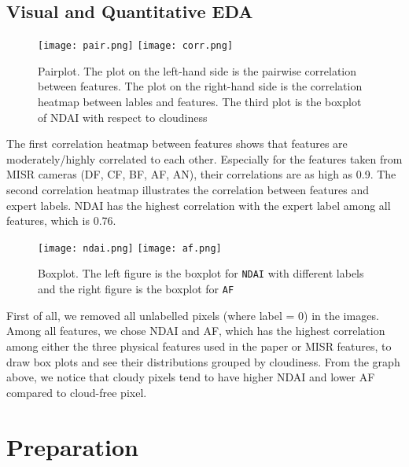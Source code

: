 \documentclass[letterpaper,11pt]{article}
\begin{document}
\subsection{Visual and Quantitative EDA}

\begin{figure}[!hbt]
    \centering
    \texttt{[image: pair.png]}
    \texttt{[image: corr.png]}
    \caption{Pairplot. The plot on the left-hand side is the pairwise correlation between features. The plot on the right-hand side is the correlation heatmap between lables and features. The third plot is the boxplot of NDAI with respect to cloudiness}
    \label{fig:pairplot}
\end{figure}

The first correlation heatmap between features shows that features are moderately/highly correlated to each other. Especially for the features taken from MISR cameras (DF, CF, BF, AF, AN), their correlations are as high as 0.9. The second correlation heatmap illustrates the correlation between features and expert labels. NDAI has the highest correlation with the expert label among all features, which is 0.76. 

\begin{figure}[!hbt]
    \centering
    \texttt{[image: ndai.png]}
    \texttt{[image: af.png]}
    \caption{Boxplot. The left figure is the boxplot for \texttt{NDAI} with different labels and the right figure is the boxplot for \texttt{AF}}
    \label{fig:boxplot}
\end{figure}

First of all, we removed all unlabelled pixels (where label = 0) in the images. Among all features, we chose NDAI and AF, which has the highest correlation among either the three physical features used in the paper or MISR features, to draw box plots and see their distributions grouped by cloudiness. From the graph above, we notice that cloudy pixels tend to have higher NDAI and lower AF compared to cloud-free pixel.

\section{Preparation}
\end{document}
